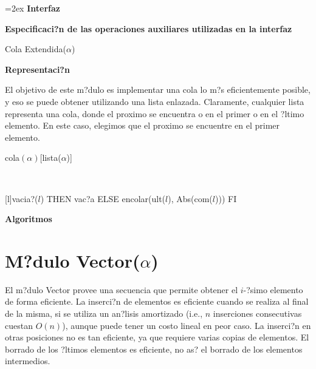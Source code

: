 \documentclass[a4paper,10pt]{article}
\newenvironment{Interfaz}{%
  \parskip=2ex%
  \noindent\textbf{\Large Interfaz}%
  \par%
}{}
\newenvironment{Representacion}{%
  \vspace*{2ex}%
  \noindent\textbf{\Large Representaci?n}%
  \vspace*{2ex}%
}{}
\newenvironment{Algoritmos}{%
  \vspace*{2ex}%
  \noindent\textbf{\Large Algoritmos}%
  \vspace*{2ex}%
}{}
\newcommand{\Titulo}[1]{
  \vspace*{1ex}\par\noindent\textbf{\large #1}\par
}
\begin{document}
\begin{Interfaz}
  \Titulo{Especificaci?n de las operaciones auxiliares utilizadas en la interfaz}

  \begin{tad}{Cola Extendida($\alpha$)}
    \parskip=0pt
    
    \tadAxiomas
  \end{tad}

\end{Interfaz}

\begin{Representacion}
  
  El objetivo de este m?dulo es implementar una cola lo m?s eficientemente posible, y eso se puede obtener utilizando una lista enlazada.  Claramente, cualquier lista representa una cola, donde el proximo se encuentra o en el primer o en el ?ltimo elemento.  En este caso, elegimos que el proximo se encuentre en el primer elemento.

  \begin{Estructura}{cola$(\alpha)$}[lista($\alpha$)]
  \end{Estructura}


  ~

  [l]{\IF vacia?($l$) THEN vac?a ELSE encolar(ult($l$), Abs(com($l$))) FI}

\end{Representacion}

\begin{Algoritmos}
  
\end{Algoritmos}


\section{M?dulo Vector($\alpha$)}

El m?dulo Vector provee una secuencia que permite obtener el $i$-?simo elemento de forma eficiente.  La inserci?n de elementos es eficiente cuando se realiza al final de la misma, si se utiliza un an?lisis amortizado (i.e., $n$ inserciones consecutivas cuestan $O(n)$), aunque puede tener un costo lineal en peor caso.  La inserci?n en otras posiciones no es tan eficiente, ya que requiere varias copias de elementos.  El borrado de los ?ltimos elementos es eficiente, no as? el borrado de los elementos intermedios.  
\end{document}
